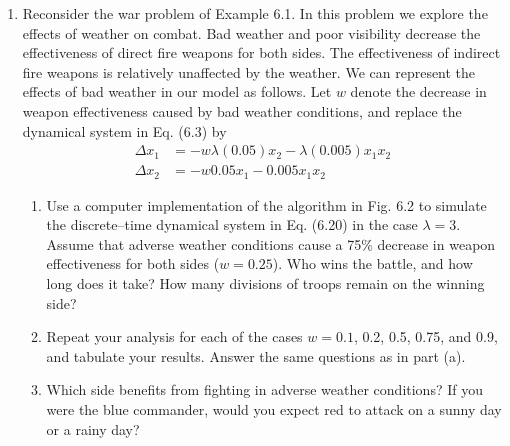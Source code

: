 \documentclass[12pt, oneside]{book}
\newenvironment{solution}{\textit{Solution.}}
\newcommand{\sol}[1]{
    \begin{customframedproof}[linecolor=orangehdx!75,]
        \begin{solution}
        #1
        \end{solution}
    \end{customframedproof}
}
\begin{document}
\begin{enumerate}
    \item Reconsider the war problem of Example 6.1. In this problem we explore the effects of weather on combat. Bad weather and poor visibility decrease the effectiveness of direct fire weapons for both sides. The effectiveness of indirect fire weapons is relatively unaffected by the weather. We can represent the effects of bad weather in our model as follows. Let \(w\) denote the decrease in weapon effectiveness caused by bad weather conditions, and replace the dynamical system in Eq. (6.3) by
    \begin{align*}
        \Delta x_{1} &= -w\lambda(0.05) x_{2} - \lambda (0.005)x_{1}x_{2} \\
        \Delta x_{2} &= -w0.05 x_{1} - 0.005x_{1}x_{2}
    \end{align*}
    \begin{enumerate}
        \item Use a computer implementation of the algorithm in Fig. 6.2 to simulate the discrete–time dynamical system in Eq. (6.20) in the case \(\lambda = 3\). Assume that adverse weather conditions cause a 75\% decrease in weapon effectiveness for both sides (\(w = 0.25\)). Who wins the battle, and how long does it take? How many divisions of troops remain on the winning side?
        \item Repeat your analysis for each of the cases \(w = 0.1\), 0.2, 0.5, 0.75, and 0.9, and tabulate your results. Answer the same questions as in part (a).
        \item Which side benefits from fighting in adverse weather conditions? If you were the blue commander, would you expect red to attack on a sunny day or a rainy day?
    \end{enumerate}
\end{enumerate}
\end{document}
